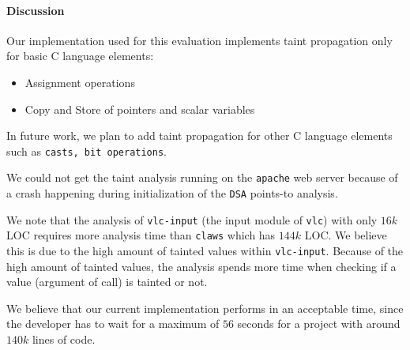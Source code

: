 \paragraph{Discussion}

Our implementation used for this evaluation implements taint
propagation only for basic C language elements:
\begin{itemize}
  \item Assignment operations
  \item Copy and Store of pointers and scalar variables
\end{itemize} 
In future work, we plan to add taint propagation for other
C language elements such as {\tt casts, bit operations}.

We could not get the taint analysis running on the \texttt{apache}
web server because of a crash happening during initialization of
the \texttt{DSA} points-to analysis.

We note that the analysis of \texttt{vlc-input} (the input module of
\texttt{vlc}) with only $16k$ LOC requires more analysis time than
\texttt{claws} which has $144k$ LOC. We believe this is due to the
high amount of tainted values within \texttt{vlc-input}. Because
of the high amount of tainted values, the analysis spends more time
when checking if a value (argument of call) is tainted or not.

We believe that our current implementation performs in an acceptable
time, since the developer has to wait for a maximum of $56$ seconds
for a project with around $140k$ lines of code.
